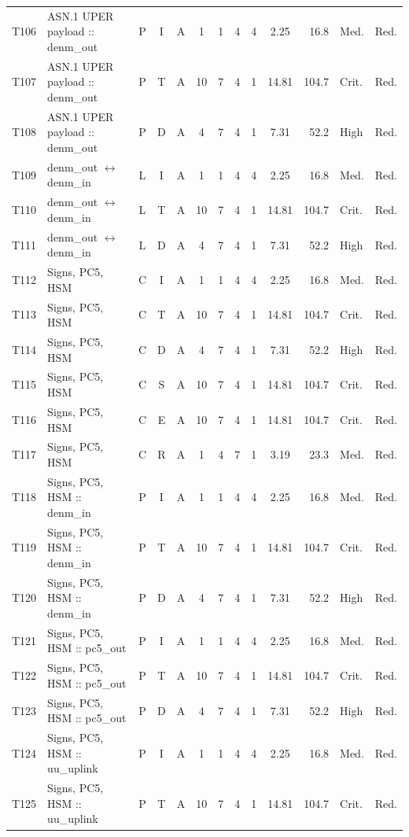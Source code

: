 \documentclass[9pt]{extarticle}
\begin{document}
\begin{longtable}{l>{\raggedright\arraybackslash}p{6.3cm}ccccccccrll}
T106 & ASN.1 UPER payload :: denm\_out & P & I & A & 1 & 1 & 4 & 4 & 2.25 & 16.8 & Med. & Red. \\
T107 & ASN.1 UPER payload :: denm\_out & P & T & A & 10 & 7 & 4 & 1 & 14.81 & 104.7 & Crit. & Red. \\
T108 & ASN.1 UPER payload :: denm\_out & P & D & A & 4 & 7 & 4 & 1 & 7.31 & 52.2 & High & Red. \\
T109 & denm\_out $\leftrightarrow$ denm\_in & L & I & A & 1 & 1 & 4 & 4 & 2.25 & 16.8 & Med. & Red. \\
T110 & denm\_out $\leftrightarrow$ denm\_in & L & T & A & 10 & 7 & 4 & 1 & 14.81 & 104.7 & Crit. & Red. \\
T111 & denm\_out $\leftrightarrow$ denm\_in & L & D & A & 4 & 7 & 4 & 1 & 7.31 & 52.2 & High & Red. \\
T112 & Signs, PC5, HSM & C & I & A & 1 & 1 & 4 & 4 & 2.25 & 16.8 & Med. & Red. \\
T113 & Signs, PC5, HSM & C & T & A & 10 & 7 & 4 & 1 & 14.81 & 104.7 & Crit. & Red. \\
T114 & Signs, PC5, HSM & C & D & A & 4 & 7 & 4 & 1 & 7.31 & 52.2 & High & Red. \\
T115 & Signs, PC5, HSM & C & S & A & 10 & 7 & 4 & 1 & 14.81 & 104.7 & Crit. & Red. \\
T116 & Signs, PC5, HSM & C & E & A & 10 & 7 & 4 & 1 & 14.81 & 104.7 & Crit. & Red. \\
T117 & Signs, PC5, HSM & C & R & A & 1 & 4 & 7 & 1 & 3.19 & 23.3 & Med. & Red. \\
T118 & Signs, PC5, HSM :: denm\_in & P & I & A & 1 & 1 & 4 & 4 & 2.25 & 16.8 & Med. & Red. \\
T119 & Signs, PC5, HSM :: denm\_in & P & T & A & 10 & 7 & 4 & 1 & 14.81 & 104.7 & Crit. & Red. \\
T120 & Signs, PC5, HSM :: denm\_in & P & D & A & 4 & 7 & 4 & 1 & 7.31 & 52.2 & High & Red. \\
T121 & Signs, PC5, HSM :: pc5\_out & P & I & A & 1 & 1 & 4 & 4 & 2.25 & 16.8 & Med. & Red. \\
T122 & Signs, PC5, HSM :: pc5\_out & P & T & A & 10 & 7 & 4 & 1 & 14.81 & 104.7 & Crit. & Red. \\
T123 & Signs, PC5, HSM :: pc5\_out & P & D & A & 4 & 7 & 4 & 1 & 7.31 & 52.2 & High & Red. \\
T124 & Signs, PC5, HSM :: uu\_uplink & P & I & A & 1 & 1 & 4 & 4 & 2.25 & 16.8 & Med. & Red. \\
T125 & Signs, PC5, HSM :: uu\_uplink & P & T & A & 10 & 7 & 4 & 1 & 14.81 & 104.7 & Crit. & Red. \\

\end{longtable}
\end{document}
